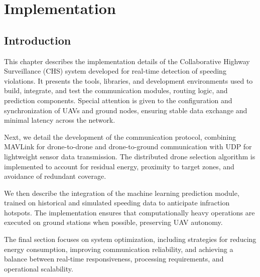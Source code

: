 \chapter{Implementation} 


\section*{Introduction}

This chapter describes the implementation details of the Collaborative Highway Surveillance (CHS) system developed for real-time detection of speeding violations. It presents the tools, libraries, and development environments used to build, integrate, and test the communication modules, routing logic, and prediction components. Special attention is given to the configuration and synchronization of UAVs and ground nodes, ensuring stable data exchange and minimal latency across the network.

Next, we detail the development of the communication protocol, combining MAVLink for drone-to-drone and drone-to-ground communication with UDP for lightweight sensor data transmission. The distributed drone selection algorithm is implemented to account for residual energy, proximity to target zones, and avoidance of redundant coverage.

We then describe the integration of the machine learning prediction module, trained on historical and simulated speeding data to anticipate infraction hotspots. The implementation ensures that computationally heavy operations are executed on ground stations when possible, preserving UAV autonomy.

The final section focuses on system optimization, including strategies for reducing energy consumption, improving communication reliability, and achieving a balance between real-time responsiveness, processing requirements, and operational scalability.